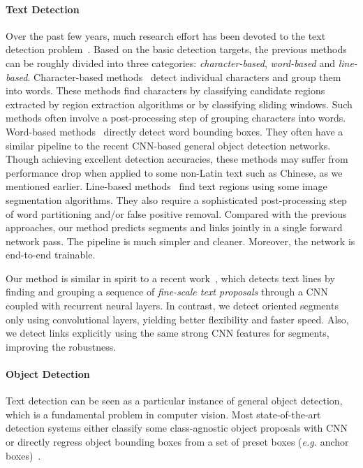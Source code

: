 \documentclass[10pt,twocolumn,letterpaper]{article}
\begin{document}
\paragraph{Text Detection}
Over the past few years, much research effort has been devoted to the text detection problem~\cite{icpr/WangWCN12,eccv/WangB10,pami/NeumannM16,pami/NeumannM16,cvpr/YaoBLMT12,iccv/HuangLYW13,eccv/HuangQT14,cvpr/ZhangZSYLB16,cvpr/ZhangSYB15,iccv/BissaccoCNN13,ijcv/JaderbergSVZ16,cvpr/GuptaVZ16,eccv/TianHHH016,corr/YaoBSZZC16}. Based on the basic detection targets, the previous methods can be roughly divided into three categories: \emph{character-based}, \emph{word-based} and \emph{line-based}.
Character-based methods~\cite{pami/NeumannM16,eccv/WangB10, icpr/WangWCN12, eccv/JaderbergVZ14, iccv/HuangLYW13, eccv/HuangQT14} detect individual characters and group them into words.
These methods find characters by classifying candidate regions extracted by region extraction algorithms or by classifying sliding windows.
Such methods often involve a post-processing step of grouping characters into words.
Word-based methods~\cite{ijcv/JaderbergSVZ16, cvpr/GuptaVZ16} directly detect word bounding boxes.
They often have a similar pipeline to the recent CNN-based general object detection networks.
Though achieving excellent detection accuracies, these methods may suffer from performance drop when applied to some non-Latin text such as Chinese, as we mentioned earlier.
Line-based methods~\cite{cvpr/ZhangSYB15, cvpr/ZhangZSYLB16,corr/YaoBSZZC16} find text regions using some image segmentation algorithms. They also require a sophisticated post-processing step of word partitioning and/or false positive removal.
Compared with the previous approaches, our method predicts segments and links jointly in a single forward network pass.
The pipeline is much simpler and cleaner.
Moreover, the network is end-to-end trainable.

Our method is similar in spirit to a recent work~\cite{eccv/TianHHH016}, which detects text lines by finding and grouping a sequence of \emph{fine-scale text proposals} through a CNN coupled with recurrent neural layers.
In contrast, we detect oriented segments only using convolutional layers, yielding better flexibility and faster speed.
Also, we detect links explicitly using the same strong CNN features for segments, improving the robustness.

\paragraph{Object Detection}
Text detection can be seen as a particular instance of general object detection, which is a fundamental problem in computer vision.
Most state-of-the-art detection systems either classify some class-agnostic object proposals with CNN~\cite{cvpr/GirshickDDM14,iccv/Girshick15,nips/RenHGS15} or directly regress object bounding boxes from a set of preset boxes (\emph{e.g.} anchor boxes)~\cite{corr/RedmonDGF15,eccv/LiuAESRFB16}.
\end{document}
